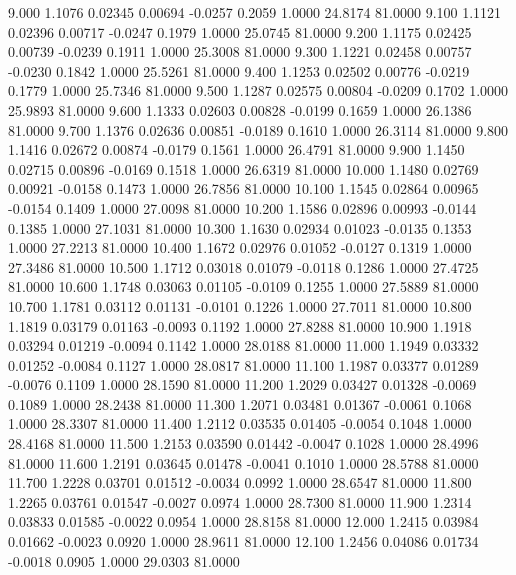    9.000   1.1076   0.02345   0.00694  -0.0257   0.2059   1.0000  24.8174  81.0000
   9.100   1.1121   0.02396   0.00717  -0.0247   0.1979   1.0000  25.0745  81.0000
   9.200   1.1175   0.02425   0.00739  -0.0239   0.1911   1.0000  25.3008  81.0000
   9.300   1.1221   0.02458   0.00757  -0.0230   0.1842   1.0000  25.5261  81.0000
   9.400   1.1253   0.02502   0.00776  -0.0219   0.1779   1.0000  25.7346  81.0000
   9.500   1.1287   0.02575   0.00804  -0.0209   0.1702   1.0000  25.9893  81.0000
   9.600   1.1333   0.02603   0.00828  -0.0199   0.1659   1.0000  26.1386  81.0000
   9.700   1.1376   0.02636   0.00851  -0.0189   0.1610   1.0000  26.3114  81.0000
   9.800   1.1416   0.02672   0.00874  -0.0179   0.1561   1.0000  26.4791  81.0000
   9.900   1.1450   0.02715   0.00896  -0.0169   0.1518   1.0000  26.6319  81.0000
  10.000   1.1480   0.02769   0.00921  -0.0158   0.1473   1.0000  26.7856  81.0000
  10.100   1.1545   0.02864   0.00965  -0.0154   0.1409   1.0000  27.0098  81.0000
  10.200   1.1586   0.02896   0.00993  -0.0144   0.1385   1.0000  27.1031  81.0000
  10.300   1.1630   0.02934   0.01023  -0.0135   0.1353   1.0000  27.2213  81.0000
  10.400   1.1672   0.02976   0.01052  -0.0127   0.1319   1.0000  27.3486  81.0000
  10.500   1.1712   0.03018   0.01079  -0.0118   0.1286   1.0000  27.4725  81.0000
  10.600   1.1748   0.03063   0.01105  -0.0109   0.1255   1.0000  27.5889  81.0000
  10.700   1.1781   0.03112   0.01131  -0.0101   0.1226   1.0000  27.7011  81.0000
  10.800   1.1819   0.03179   0.01163  -0.0093   0.1192   1.0000  27.8288  81.0000
  10.900   1.1918   0.03294   0.01219  -0.0094   0.1142   1.0000  28.0188  81.0000
  11.000   1.1949   0.03332   0.01252  -0.0084   0.1127   1.0000  28.0817  81.0000
  11.100   1.1987   0.03377   0.01289  -0.0076   0.1109   1.0000  28.1590  81.0000
  11.200   1.2029   0.03427   0.01328  -0.0069   0.1089   1.0000  28.2438  81.0000
  11.300   1.2071   0.03481   0.01367  -0.0061   0.1068   1.0000  28.3307  81.0000
  11.400   1.2112   0.03535   0.01405  -0.0054   0.1048   1.0000  28.4168  81.0000
  11.500   1.2153   0.03590   0.01442  -0.0047   0.1028   1.0000  28.4996  81.0000
  11.600   1.2191   0.03645   0.01478  -0.0041   0.1010   1.0000  28.5788  81.0000
  11.700   1.2228   0.03701   0.01512  -0.0034   0.0992   1.0000  28.6547  81.0000
  11.800   1.2265   0.03761   0.01547  -0.0027   0.0974   1.0000  28.7300  81.0000
  11.900   1.2314   0.03833   0.01585  -0.0022   0.0954   1.0000  28.8158  81.0000
  12.000   1.2415   0.03984   0.01662  -0.0023   0.0920   1.0000  28.9611  81.0000
  12.100   1.2456   0.04086   0.01734  -0.0018   0.0905   1.0000  29.0303  81.0000
